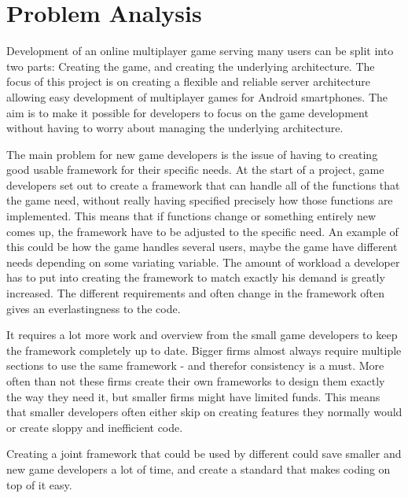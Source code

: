 \chapter{Problem Analysis}


Development of an online multiplayer game serving many users can be split into two parts: Creating the game, and creating the underlying architecture. The focus of this project is on creating a flexible and reliable server architecture  allowing easy development of multiplayer games for Android smartphones. The aim is to make it possible for developers to focus on the game development without having to worry about managing the underlying architecture. 

The main problem for new game developers is the issue of having to creating  good usable framework for their specific needs. At the start of a project, game developers set out to create a framework that can handle all of the functions that the game need, without really having specified precisely how those functions are implemented. This means that if functions change or something entirely new comes up, the framework have to be adjusted to the specific need. An example of this could be how the game handles several users, maybe the game have different needs depending on some variating variable. The amount of workload a developer has to put into creating the framework to match exactly his demand is greatly increased. The different requirements and often change in the framework often gives an everlastingness to the code.

It requires a lot more work and overview from the small game developers to keep the framework completely up to date. Bigger firms almost always require multiple sections to use the same framework - and therefor consistency is a must. More often than not these firms create their own frameworks to design them exactly the way they need it, but smaller firms might have limited funds. This means that smaller developers often either skip on creating features they normally would or create sloppy and inefficient code.

Creating a joint framework that could be used by different could save smaller and new game developers a lot of time, and create a standard that makes coding on top of it easy. 






